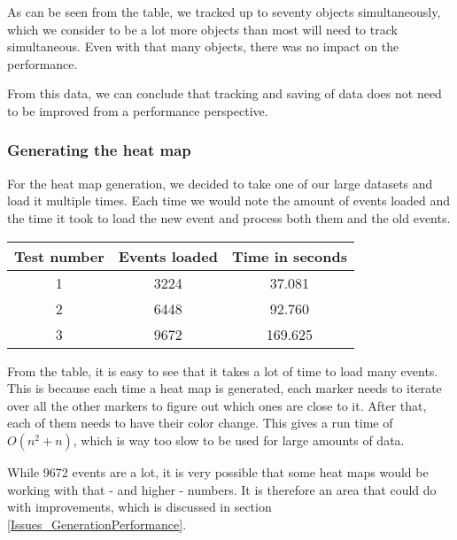 As can be seen from the table, we tracked up to seventy objects simultaneously, which we consider to be a lot more objects than most will need to track simultaneous. Even with that many objects, there was no impact on the performance.

From this data, we can conclude that tracking and saving of data does not need to be improved from a performance perspective.

\subsubsection{Generating the heat map}
\label{Testing_Performance_Generating}

For the heat map generation, we decided to take one of our large datasets and load it multiple times. Each time we would note the amount of events loaded and the time it took to load the new event and process both them and the old events.

\begin{center}
	\begin{tabular}{| c | c | c |}
		\hline
		Test number & Events loaded & Time in seconds \\ \hline
		1 & 3224 & 37.081 \\ \hline
		2 & 6448 & 92.760 \\ \hline
		3 & 9672 & 169.625 \\
		\hline
	\end{tabular}
\end{center}

From the table, it is easy to see that it takes a lot of time to load many events. This is because each time a heat map is generated, each marker needs to iterate over all the other markers to figure out which ones are close to it. After that, each of them needs to have their color change. This gives a run time of $O(n^2 + n)$, which is way too slow to be used for large amounts of data.

While 9672 events are a lot, it is very possible that some heat maps would be working with that - and higher - numbers. It is therefore an area that could do with improvements, which is discussed in section \ref{Issues_GenerationPerformance}.